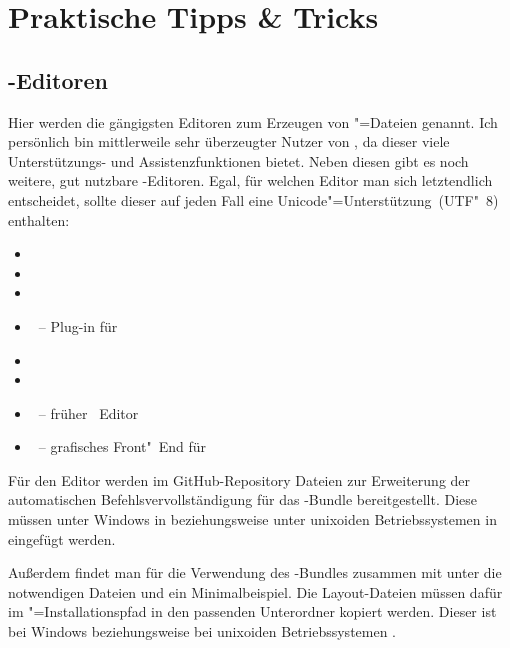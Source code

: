\chapter{Praktische Tipps \& Tricks}
\label{sec:tips}
\newcommand*\TaT{\hyperref[sec:tips]{Tipps \& Tricks}}
\section{-Editoren}
\label{sec:tips:editor}
Hier werden die gängigsten Editoren zum Erzeugen von "=Dateien 
genannt. Ich persönlich bin mittlerweile sehr überzeugter Nutzer von 
, da dieser viele Unterstützungs- und 
Assistenzfunktionen bietet. Neben diesen gibt es noch weitere, gut nutzbare 
-Editoren. Egal, für welchen Editor man sich letztendlich 
entscheidet, sollte dieser auf jeden Fall eine Unicode"=Unterstützung~(UTF"~8) 
enthalten:
%
\begin{itemize}
\item {}
\item {}
\item {}
\item {}~-- Plug-in für 
\item {}
\item {}
\item {}~-- früher ~Editor
\item {}~-- grafisches Front"~End für 
\end{itemize}
%
Für den Editor werden im GitHub-Repository
Dateien zur Erweiterung der automatischen Befehlsvervollständigung für das 
\TUDScript-Bundle bereitgestellt. Diese müssen unter Windows in
 beziehungsweise unter unixoiden 
Betriebssystemen in  eingefügt werden.

Außerdem findet man für die Verwendung des \TUDScript-Bundles zusammen mit 
 unter
die notwendigen Dateien und ein Minimalbeispiel. Die Layout-Dateien müssen 
dafür im "=Installationspfad in den passenden 
Unterordner kopiert werden. Dieser ist bei Windows
beziehungsweise bei unixoiden Betriebssystemen .



